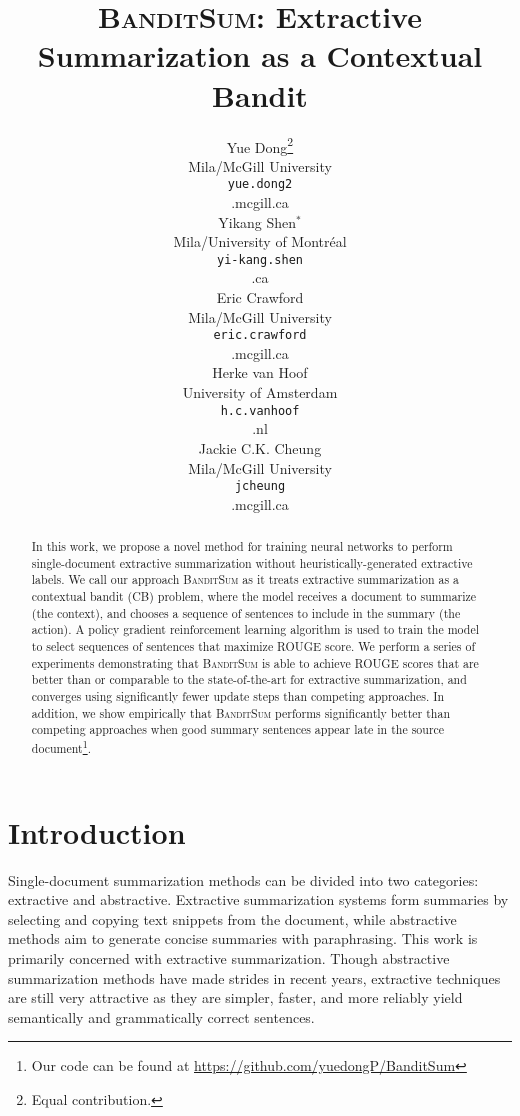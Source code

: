 \documentclass[11pt,a4paper]{article}
\title{\textsc{BanditSum}: Extractive Summarization as a Contextual Bandit}
\author{Yue Dong\thanks{\;\;Equal contribution. 
} \\
  Mila/McGill University \\ 
  {\tt yue.dong2}\\{\tt@mail.mcgill.ca} \\
  \And
  Yikang Shen$^{*}$ \\
  Mila/University of Montr\'eal \\ 
  {\tt yi-kang.shen}\\{\tt@umontreal.ca} \\
  \AND
  Eric Crawford \\
  Mila/McGill University\\
  {\tt eric.crawford}\\{\tt@mail.mcgill.ca} \\
  \And
  Herke van Hoof \\
  University of Amsterdam\\
  {\tt h.c.vanhoof}\\{\tt@uva.nl} \\
  \And
  Jackie C.K. Cheung \\
  Mila/McGill University\\
  {\tt jcheung}\\{\tt@cs.mcgill.ca}
  }
\date{}
\newcommand{\B}{\textsc{BanditSum }}
\begin{document}
\maketitle
\begin{abstract}
In this work, we propose a novel method for training neural networks to perform single-document extractive summarization without heuristically-generated extractive labels. We call our approach \B as it treats extractive summarization as a contextual bandit (CB) problem, where the model receives a document to summarize (the context), and chooses a sequence of sentences to include in the summary (the action). A policy gradient reinforcement learning algorithm is used to train the model to select sequences of sentences that maximize ROUGE score. We perform a series of experiments demonstrating that \B is able to achieve ROUGE scores that are better than or comparable to the state-of-the-art for extractive summarization, and converges using significantly fewer update steps than competing approaches. In addition, we show empirically that \B performs significantly better than competing approaches when good summary sentences appear late in the source document\footnote{Our code can be found at \url{https://github.com/yuedongP/BanditSum}}.

\end{abstract}

\section{Introduction}
Single-document summarization methods can be divided into two categories: extractive and abstractive. Extractive summarization systems form summaries by selecting and copying text snippets from the document, while abstractive methods aim to generate concise summaries with paraphrasing. This work is primarily concerned with extractive summarization. Though abstractive summarization methods have made strides in recent years, extractive techniques are still very attractive as they are simpler, faster, and more reliably yield semantically and grammatically correct sentences.
\end{document}
